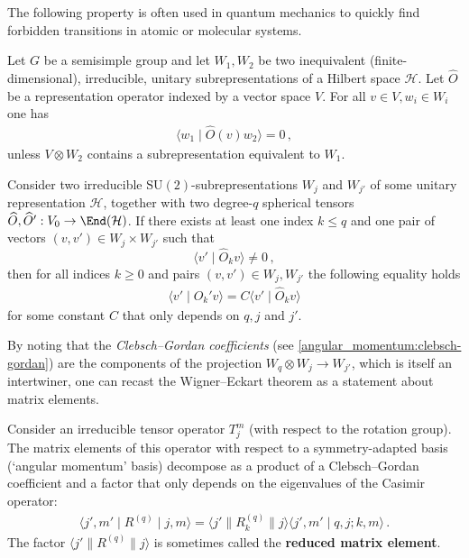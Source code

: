     The following property is often used in quantum mechanics to quickly find forbidden transitions in atomic or molecular systems.
    \begin{property}
        Let $G$ be a semisimple group and let $W_1,W_2$ be two inequivalent (finite-dimensional), irreducible, unitary subrepresentations of a Hilbert space $\mathcal{H}$. Let $\widehat{O}$ be a representation operator indexed by a vector space $V$. For all $v\in V,w_i\in W_i$ one has
        \begin{gather}
            \langle w_1\mid\widehat{O}(v)w_2 \rangle=0\,,
        \end{gather}
        unless $V\otimes W_2$ contains a subrepresentation equivalent to $W_1$.
    \end{property}

    \begin{theorem}
        Consider two irreducible $\mathrm{SU}(2)$-subrepresentations $W_j$ and $W_{j'}$ of some unitary representation $\mathcal{H}$, together with two degree-$q$ spherical tensors $\widehat{O},\widehat{O}':V_0\rightarrow\End(\mathcal{H})$. If there exists at least one index $k\leq q$ and one pair of vectors $(v,v')\in W_j\times W_{j'}$ such that \[\langle v'\mid\widehat{O}_kv \rangle\neq0\,,\] then for all indices $k\geq 0$ and pairs $(v,v')\in W_j,W_{j'}$ the following equality holds
        \begin{gather}
            \langle v'\mid\widehat{O}_k'v \rangle = C\langle v'\mid\widehat{O}_kv \rangle
        \end{gather}
        for some constant $C$ that only depends on $q,j$ and $j'$.
    \end{theorem}
    By noting that the \textit{Clebsch--Gordan coefficients} (see \cref{angular_momentum:clebsch-gordan}) are the components of the projection $W_q\otimes W_j\rightarrow W_{j'}$, which is itself an intertwiner, one can recast the Wigner--Eckart theorem as a statement about matrix elements.
    \begin{result}
        Consider an irreducible tensor operator $T_j^m$ (with respect to the rotation group). The matrix elements of this operator with respect to a symmetry-adapted basis (`angular momentum' basis) decompose as a product of a Clebsch--Gordan coefficient and a factor that only depends on the eigenvalues of the Casimir operator:
        \begin{gather}
            \langle j',m'\mid R^{(q)}\mid j,m \rangle = \langle j'\|R_k^{(q)}\|j \rangle\langle j',m'\mid q,j;k,m \rangle\,.
        \end{gather}
        The factor $\langle j'\|R^{(q)}\|j \rangle$ is sometimes called the \textbf{reduced matrix element}.
    \end{result}